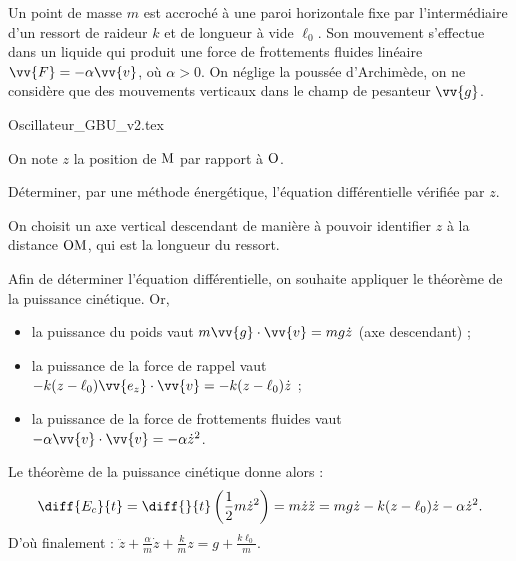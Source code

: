 \hauteurLargeurCadreReponse		{10mm}{9cm}
\initialisationEntrainement

Un point \ptM  de masse $m$ est accroché à une paroi horizontale fixe par l'intermédiaire d'un ressort de raideur $k$ et de longueur à vide $\ell_0$. Son mouvement s'effectue dans un liquide qui produit une force de frottements fluides linéaire $\vv{F}
=-\alpha\vv{v}$, où $\alpha>0$. On néglige la poussée d'Archimède, on ne considère que des mouvements verticaux dans le champ de pesanteur $\vv{g}$.


\begin{center}
{Oscillateur_GBU_v2.tex}
\end{center}


\debutEntrainement


\begin{enonce}
On note $z$ la position de $\ptM$ par rapport à $\ptO$. 

Déterminer, par une méthode énergétique, l'équation différentielle vérifiée par $z$.

\end{enonce}


\begin{corrige}
On choisit un axe vertical descendant de manière à pouvoir identifier $z$ à la distance $\ptO\ptM$, qui est la longueur du ressort.

Afin de déterminer l'équation différentielle, on souhaite appliquer le théorème de la puissance cinétique. Or, 
\begin{itemize}
\item[$\bullet$] la puissance du poids vaut $m\vv{g}\cdot\vv{v}=mg\dot z$ (axe descendant) ;
\item[$\bullet$] la puissance de la force de rappel vaut $-k(z-\ell_0)\vv{e_z}\cdot\vv{v} = -k(z-\ell_0)\dot z$ ;
\item[$\bullet$] la puissance de la force de frottements fluides vaut $-\alpha\vv{v}\cdot\vv{v}=-\alpha\dot z^2$.
\end{itemize}

Le théorème de la puissance cinétique donne alors :
\[
\diff{E_c}{t} = \diff{}{t}\left(\frac{1}{2}m\dot z^2\right) = m\dot z \ddot z = 
mg\dot z -k(z-\ell_0)\dot z -\alpha\dot z^2.
\]
D'où finalement : $\ddot z +\frac{\alpha}{m}\dot z + \frac{k}{m}z =  g+\frac{k \ell_0}{m}$.
\end{corrige}

